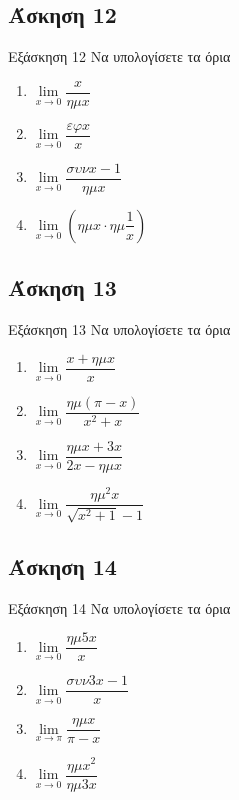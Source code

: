 \documentclass[greek]{beamer}
\begin{document}
\subsection{Άσκηση 12}
\begin{frame}[label=Άσκηση12,t]{Εξάσκηση 12}
  Να υπολογίσετε τα όρια
  \begin{enumerate}
    \item $\lim\limits_{x \to 0}{ \dfrac{x}{ημx} }$ \pause
    \item $\lim\limits_{x \to 0}{ \dfrac{εφx}{x} }$ \pause
    \item $\lim\limits_{x \to 0}{ \dfrac{συνx-1}{ημx} }$ \pause
    \item $\lim\limits_{x \to 0}{ \left( ημx\cdot ημ\dfrac{1}{x} \right) }$
  \end{enumerate}

\end{frame}

\subsection{Άσκηση 13}
\begin{frame}[label=Άσκηση13,t]{Εξάσκηση 13}
  Να υπολογίσετε τα όρια
  \begin{enumerate}
    \item $\lim\limits_{x \to 0}{ \dfrac{x+ημx}{x} }$ \pause
    \item $\lim\limits_{x \to 0}{ \dfrac{ημ(π-x)}{x^2+x} }$ \pause
    \item $\lim\limits_{x \to 0}{ \dfrac{ημx+3x}{2x-ημx} }$ \pause
    \item $\lim\limits_{x \to 0}{ \dfrac{ημ^2x}{\sqrt{x^2+1}-1} }$
  \end{enumerate}

\end{frame}

\subsection{Άσκηση 14}
\begin{frame}[label=Άσκηση14,t]{Εξάσκηση 14}
  Να υπολογίσετε τα όρια
  \begin{enumerate}
    \item $\lim\limits_{x \to 0}{ \dfrac{ημ5x}{x} }$ \pause
    \item $\lim\limits_{x \to 0}{ \dfrac{συν3x-1}{x} }$ \pause
    \item $\lim\limits_{x \to π}{ \dfrac{ημx}{π-x} }$ \pause
    \item $\lim\limits_{x \to 0}{ \dfrac{ημx^2}{ημ3x} }$
  \end{enumerate}

\end{frame}
\end{document}
